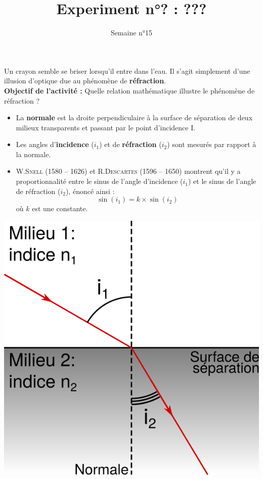 \documentclass{HSP-Experiment} %
\title{Experiment n°? : ???}
\date{Semaine n°15}
\begin{document}
	\maketitle
	
	Un crayon semble se briser lorsqu'il entre dans l'eau. Il s'agit simplement d'une illusion d'optique due au phénomène de \textbf{réfraction}.\\
	
	\textbf{Objectif de l'activité :} Quelle relation mathématique illustre le phénomène de réfraction ?
	
	\begin{doc}
		\vspace*{-\baselineskip}
		\begin{multicols}{2}
			\begin{itemize}
				\item La \textbf{normale} est la droite perpendiculaire à la surface de séparation de deux milieux transparents et passant par le point d'incidence I.
				\item Les angles d'\textbf{incidence} ($i_1$) et de \textbf{réfraction} ($i_2$) sont mesurés par rapport à la normale.
				\item W.S\textsc{nell} (1580 -- 1626) et R.D\textsc{escartes} (1596 -- 1650) montrent qu'il y a proportionnalité entre le sinus de l'angle d'incidence ($i_1$) et le sinus de l'angle de réfraction ($i_2$), énoncé ainsi :
				$$\sin(i_1) = k \times \sin(i_2)$$
				où $k$ est une constante.
			\end{itemize}
		
			\begin{center}
				\includegraphics[scale=1]{SD}
			\end{center}
		\end{multicols}
	\end{doc}
	
\end{document}
